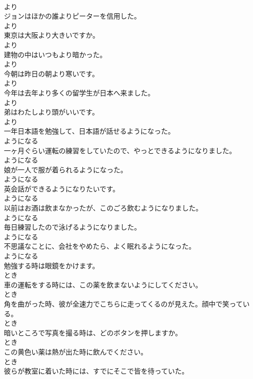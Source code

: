 \documentclass[8pt]{extreport}
\begin{document}
\begin{CJK}{UTF8}{min}
\\	より
\\	ジョンはほかの誰よりピーターを信用した。	
\\	より
\\	東京は大阪より大きいですか。	
\\	より
\\	建物の中はいつもより暗かった。	
\\	より
\\	今朝は昨日の朝より寒いです。	
\\	より
\\	今年は去年より多くの留学生が日本へ来ました。	
\\	より
\\	弟はわたしより頭がいいです。	
\\	より
\\	一年日本語を勉強して、日本語が話せるようになった。	
\\	ようになる
\\	一ヶ月ぐらい運転の練習をしていたので、やっとできるようになりました。	
\\	ようになる
\\	娘が一人で服が着られるようになった。	
\\	ようになる
\\	英会話ができるようになりたいです。	
\\	ようになる
\\	以前はお酒は飲まなかったが、このごろ飲むようになりました。	
\\	ようになる
\\	毎日練習したので泳げるようになりました。	
\\	ようになる
\\	不思議なことに、会社をやめたら、よく眠れるようになった。	
\\	ようになる
\\	勉強する時は眼鏡をかけます。	
\\	とき
\\	車の運転をする時には、この薬を飲まないようにしてください。	
\\	とき
\\	角を曲がった時、彼が全速力でこちらに走ってくるのが見えた。顔中で笑っている。	
\\	とき
\\	暗いところで写真を撮る時は、どのボタンを押しますか。	
\\	とき
\\	この黄色い薬は熱が出た時に飲んでください。	
\\	とき
\\	彼らが教室に着いた時には、すでにそこで皆を待っていた。	

\end{CJK}
\end{document}
